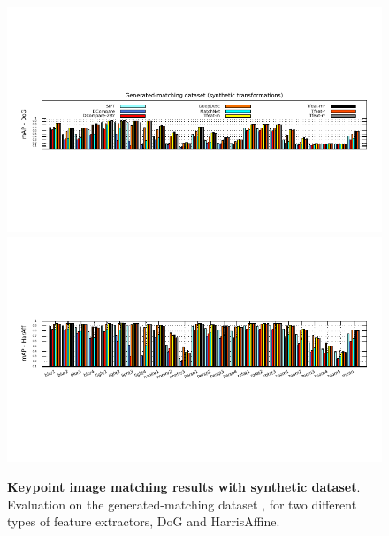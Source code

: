 \begin{figure}
\centering    
\includegraphics[trim={0.22cm 2.6cm 0.22cm 2.6cm},width=\textwidth]{main/chapter02/images/fischer_dog}
\includegraphics[trim={0.22cm 3cm 0.22cm 3cm},width=\textwidth]{main/chapter02/images/fischer_haraff}
\caption[Keypoint image matching results with synthetic dataset]{\textbf{Keypoint image matching results with synthetic dataset}. Evaluation on the generated-matching dataset
  \cite{FDB14}, for two different types of feature
  extractors, DoG and  HarrisAffine.}
\label{fig:fischer_results}
\vspace{-0.2cm}
\end{figure}


